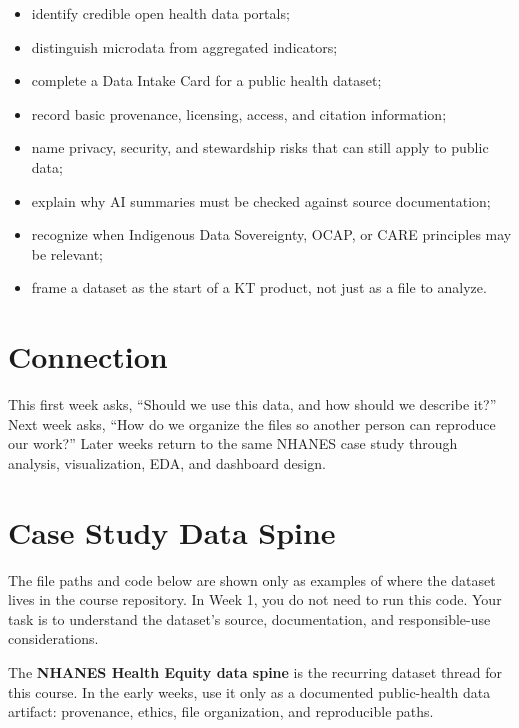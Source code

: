 \documentclass[
  letterpaper,
  DIV=11,
  numbers=noendperiod,
  oneside]{scrreprt}
\providecommand{\tightlist}{%
  \setlength{\itemsep}{0pt}\setlength{\parskip}{0pt}}
\begin{document}
\begin{itemize}
\tightlist
\item
  identify credible open health data portals;
\item
  distinguish microdata from aggregated indicators;
\item
  complete a Data Intake Card for a public health dataset;
\item
  record basic provenance, licensing, access, and citation information;
\item
  name privacy, security, and stewardship risks that can still apply to
  public data;
\item
  explain why AI summaries must be checked against source documentation;
\item
  recognize when Indigenous Data Sovereignty, OCAP, or CARE principles
  may be relevant;
\item
  frame a dataset as the start of a KT product, not just as a file to
  analyze.
\end{itemize}

\section*{Connection}\label{connection}


This first week asks, ``Should we use this data, and how should we
describe it?'' Next week asks, ``How do we organize the files so another
person can reproduce our work?'' Later weeks return to the same NHANES
case study through analysis, visualization, EDA, and dashboard design.

\section*{Case Study Data Spine}\label{case-study-data-spine}


The file paths and code below are shown only as examples of where the
dataset lives in the course repository. In Week 1, you do not need to
run this code. Your task is to understand the dataset's source,
documentation, and responsible-use considerations.

The \textbf{NHANES Health Equity data spine} is the recurring dataset
thread for this course. In the early weeks, use it only as a documented
public-health data artifact: provenance, ethics, file organization, and
reproducible paths.
\end{document}
